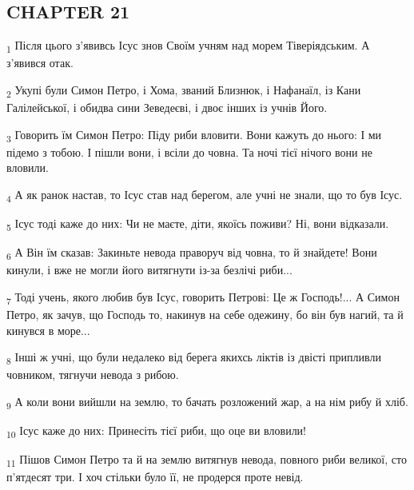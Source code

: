 \subsection{CHAPTER 21}
\begin{tcolorbox}
\textsubscript{1} Після цього з'явивсь Ісус знов Своїм учням над морем Тіверіядським. А з'явився отак.
\end{tcolorbox}
\begin{tcolorbox}
\textsubscript{2} Укупі були Симон Петро, і Хома, званий Близнюк, і Нафанаїл, із Кани Галілейської, і обидва сини Зеведеєві, і двоє інших із учнів Його.
\end{tcolorbox}
\begin{tcolorbox}
\textsubscript{3} Говорить їм Симон Петро: Піду риби вловити. Вони кажуть до нього: І ми підемо з тобою. І пішли вони, і всіли до човна. Та ночі тієї нічого вони не вловили.
\end{tcolorbox}
\begin{tcolorbox}
\textsubscript{4} А як ранок настав, то Ісус став над берегом, але учні не знали, що то був Ісус.
\end{tcolorbox}
\begin{tcolorbox}
\textsubscript{5} Ісус тоді каже до них: Чи не маєте, діти, якоїсь поживи? Ні, вони відказали.
\end{tcolorbox}
\begin{tcolorbox}
\textsubscript{6} А Він їм сказав: Закиньте невода праворуч від човна, то й знайдете! Вони кинули, і вже не могли його витягнути із-за безлічі риби...
\end{tcolorbox}
\begin{tcolorbox}
\textsubscript{7} Тоді учень, якого любив був Ісус, говорить Петрові: Це ж Господь!... А Симон Петро, як зачув, що Господь то, накинув на себе одежину, бо він був нагий, та й кинувся в море...
\end{tcolorbox}
\begin{tcolorbox}
\textsubscript{8} Інші ж учні, що були недалеко від берега якихсь ліктів із двісті припливли човником, тягнучи невода з рибою.
\end{tcolorbox}
\begin{tcolorbox}
\textsubscript{9} А коли вони вийшли на землю, то бачать розложений жар, а на нім рибу й хліб.
\end{tcolorbox}
\begin{tcolorbox}
\textsubscript{10} Ісус каже до них: Принесіть тієї риби, що оце ви вловили!
\end{tcolorbox}
\begin{tcolorbox}
\textsubscript{11} Пішов Симон Петро та й на землю витягнув невода, повного риби великої, сто п'ятдесят три. І хоч стільки було її, не продерся проте невід.
\end{tcolorbox}
